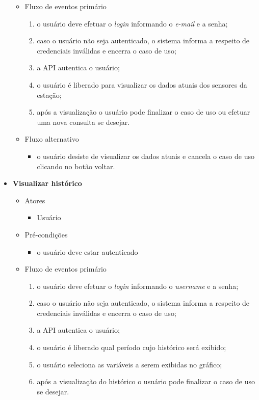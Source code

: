 \begin{itemize}
\begin{itemize}
	    	\item Fluxo de eventos primário
			    \begin{enumerate}
		    	    \item o usuário deve efetuar o \textit{login} informando o \textit{e-mail} e a senha;
	    		    \item caso o usuário não seja autenticado, o sistema informa a respeito de credenciais inválidas e encerra o caso de uso;
		    	    \item a API autentica o usuário;
    			    \item o usuário é liberado para visualizar os dados atuais dos sensores da estação;
		        	\item após a visualização o usuário pode finalizar o caso de uso ou efetuar uma nova consulta se desejar.
			    \end{enumerate}

    		\item Fluxo alternativo
			    \begin{itemize}
    			   \item o usuário desiste de visualizar os dados atuais e cancela o caso de uso clicando no botão voltar.
			    \end{itemize}

		\end{itemize}

	\item \textbf{Visualizar histórico}

		\begin{itemize}
		    \item Atores
	    		\begin{itemize}
		    	    \item Usuário
	    		\end{itemize}

	    	\item Pré-condições
    			\begin{itemize}
			        \item o usuário deve estar autenticado
			    \end{itemize}

		    \item Fluxo de eventos primário
			    \begin{enumerate}
			        \item o usuário deve efetuar o \textit{login} informando o \textit{username} e a senha;
			        \item caso o usuário não seja autenticado, o sistema informa a respeito de credenciais inválidas e encerra o caso de uso;
			        \item a API autentica o usuário;
			        \item o usuário é liberado qual período cujo histórico será exibido;
			        \item o usuário seleciona as variáveis a serem exibidas no gráfico;
			        \item após a visualização do histórico o usuário pode finalizar o caso de uso se desejar.
			    \end{enumerate}


\end{itemize}
\end{itemize}
